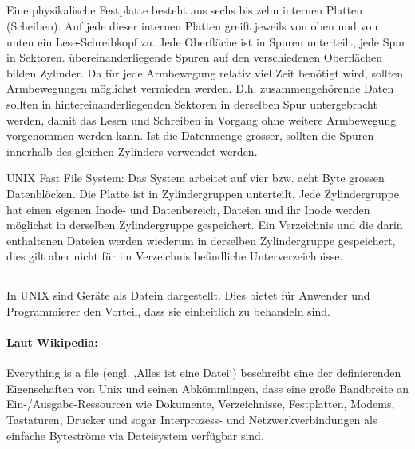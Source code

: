 \subsection{}
\begin{answer}
Eine physikalische Festplatte besteht aus sechs bis zehn internen Platten (Scheiben). Auf jede
dieser internen Platten greift jeweils von oben und von unten ein Lese-Schreibkopf zu. Jede
Oberfläche ist in Spuren unterteilt, jede Spur in Sektoren. übereinanderliegende Spuren auf den
verschiedenen Oberflächen bilden Zylinder. Da für jede Armbewegung relativ viel Zeit benötigt
wird, sollten Armbewegungen möglichst vermieden werden. D.h. zusammengehörende Daten sollten
in hintereinanderliegenden Sektoren in derselben Spur untergebracht werden, damit das Lesen
und Schreiben in Vorgang ohne weitere Armbewegung vorgenommen werden kann. Ist die Datenmenge
grösser, sollten die Spuren innerhalb des gleichen Zylinders verwendet werden.

UNIX Fast File System:
Das System arbeitet auf vier bzw. acht Byte grossen Datenblöcken. Die Platte ist in Zylindergruppen unterteilt. Jede Zylindergruppe hat einen eigenen Inode- und Datenbereich, Dateien und ihr Inode werden möglichst in derselben Zylindergruppe gespeichert. Ein Verzeichnis und die darin enthaltenen Dateien werden wiederum in derselben Zylindergruppe gespeichert, dies gilt aber nicht für im Verzeichnis befindliche Unterverzeichnisse.
\end{answer}

\subsection{}
\begin{answer}
In UNIX sind Geräte als Datein dargestellt. Dies bietet für Anwender und Programmierer den
Vorteil, dass sie einheitlich zu behandeln sind.

\paragraph*{Laut Wikipedia:}
Everything is a file (engl. ‚Alles ist eine Datei‘) beschreibt eine der definierenden Eigenschaften von Unix und seinen Abkömmlingen, dass eine große Bandbreite an Ein-/Ausgabe-Ressourcen wie Dokumente, Verzeichnisse, Festplatten, Modems, Tastaturen, Drucker und sogar Interprozess- und Netzwerkverbindungen als einfache Byteströme via Dateisystem verfügbar sind.
\end{answer}

